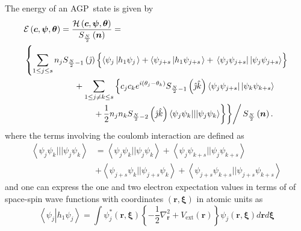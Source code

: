 \documentclass[aps,preprint]{revtex4}%
\begin{document}
The energy of an AGP\ state is given by
\begin{align}
&  \mathcal{E}\left(  \boldsymbol{c},\boldsymbol{\psi},\boldsymbol{\theta
}\right)  =\frac{\mathcal{H}\left(  \boldsymbol{c},\boldsymbol{\psi
},\boldsymbol{\theta}\right)  }{S_{\frac{N}{2}}\left(  \boldsymbol{n}\right)
}=\nonumber\\
&  \left\{  \sum_{1\leq j\leq s}n_{j}S_{\frac{N}{2}-1}\left(  \hat{\jmath
}\right)  \left\{  \overset{}{\left\langle \psi_{j}\left\vert h_{1}\psi
_{j}\right.  \right\rangle +\left\langle \psi_{j+s}\left\vert h_{1}\psi
_{j+s}\right.  \right\rangle }+\,\left\langle \psi_{j}\psi_{j+s}\right\vert
\left\vert \psi_{j}\psi_{j+s}\right\rangle \right\}  \right.  \nonumber\\
&  \qquad\qquad\qquad+\sum_{1\leq j\neq k\leq s}\left\{  c_{j}c_{k}e^{i\left(
\theta_{j}-\theta_{k}\right)  }S_{\frac{N}{2}-1}\left(  \hat{\jmath}\hat
{k}\right)  \left\langle \psi_{j}\psi_{j+s}\right\vert \left\vert \psi_{k}%
\psi_{k+s}\right\rangle \right.  \nonumber\\
&  \qquad\qquad\qquad\qquad\left.  \left.  \left.  +\,\frac{1}{2}\overset
{}{n_{j}n_{k}S_{\frac{N}{2}-2}\left(  \hat{\jmath}\hat{k}\right)  \left\langle
\psi_{j}\psi_{k}|||\psi_{j}\psi_{k}\right\rangle }\right\}  \right\}  \right/
S_{\frac{N}{2}}\left(  \boldsymbol{n}\right)  .\label{EnFunc}%
\end{align}
where the terms involving the coulomb interaction are defined as
\begin{align}
\left\langle \psi_{j}\psi_{k}|||\psi_{j}\psi_{k}\right\rangle  &
=\left\langle \psi_{j}\psi_{k}||\psi_{j}\psi_{k}\right\rangle +\left\langle
\psi_{j}\psi_{k+s}||\psi_{j}\psi_{k+s}\right\rangle \nonumber\\
&  +\left\langle \psi_{j+s}\psi_{k}||\psi_{j+s}\psi_{k}\right\rangle
+\left\langle \psi_{j+s}\psi_{k+s}||\psi_{j+s}\psi_{k+s}\right\rangle
\end{align}
and one can express the one and two electron expectation values in terms of of
space-spin wave functions with coordinates $\left(  \boldsymbol{r}%
,\boldsymbol{\xi}\right)  $ in atomic units as
\begin{equation}
\left\langle \psi_{j}\left\vert h_{1}\psi_{j}\right.  \right\rangle =\int
\psi_{j}^{\ast}\left(  \boldsymbol{r},\boldsymbol{\xi}\right)  \left\{
-\frac{1}{2}\nabla_{\boldsymbol{r}}^{2}+V_{\text{ext}}\left(  \boldsymbol{r}%
\right)  \right\}  \psi_{j}\left(  \boldsymbol{r},\boldsymbol{\xi}\right)
d\boldsymbol{r}d\boldsymbol{\xi}%
\end{equation}
\end{document}
